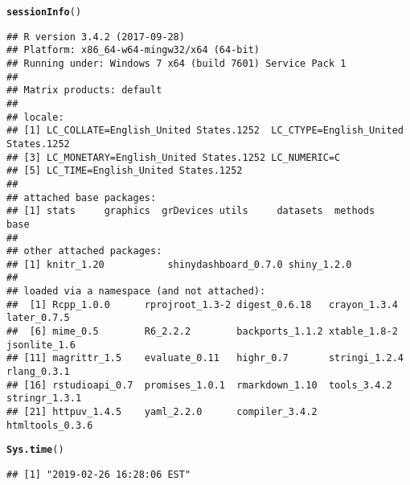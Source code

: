 \documentclass{article}\usepackage[]{graphicx}\usepackage[]{color}
\makeatletter
\newcommand{\hlstd}[1]{\textcolor[rgb]{0.345,0.345,0.345}{#1}}%
\newcommand{\hlkwd}[1]{\textcolor[rgb]{0.737,0.353,0.396}{\textbf{#1}}}%
\newenvironment{kframe}{%
 \def\at@end@of@kframe{}%
 \ifinner\ifhmode%
  \def\at@end@of@kframe{\end{minipage}}%
  \begin{minipage}{\columnwidth}%
 \fi\fi%
 \def\FrameCommand##1{\hskip\@totalleftmargin \hskip-\fboxsep
 \colorbox{shadecolor}{##1}\hskip-\fboxsep
     \hskip-\linewidth \hskip-\@totalleftmargin \hskip\columnwidth}%
 \MakeFramed {\advance\hsize-\width
   \@totalleftmargin\z@ \linewidth\hsize
   \@setminipage}}%
 {\par\unskip\endMakeFramed%
 \at@end@of@kframe}
\newenvironment{knitrout}{}{} %
\makeatother
\begin{document}
\begin{knitrout}
\color{fgcolor}\begin{kframe}
\begin{alltt}
\hlkwd{sessionInfo}\hlstd{()}
\end{alltt}
\begin{verbatim}
## R version 3.4.2 (2017-09-28)
## Platform: x86_64-w64-mingw32/x64 (64-bit)
## Running under: Windows 7 x64 (build 7601) Service Pack 1
## 
## Matrix products: default
## 
## locale:
## [1] LC_COLLATE=English_United States.1252  LC_CTYPE=English_United States.1252   
## [3] LC_MONETARY=English_United States.1252 LC_NUMERIC=C                          
## [5] LC_TIME=English_United States.1252    
## 
## attached base packages:
## [1] stats     graphics  grDevices utils     datasets  methods   base     
## 
## other attached packages:
## [1] knitr_1.20           shinydashboard_0.7.0 shiny_1.2.0         
## 
## loaded via a namespace (and not attached):
##  [1] Rcpp_1.0.0      rprojroot_1.3-2 digest_0.6.18   crayon_1.3.4    later_0.7.5    
##  [6] mime_0.5        R6_2.2.2        backports_1.1.2 xtable_1.8-2    jsonlite_1.6   
## [11] magrittr_1.5    evaluate_0.11   highr_0.7       stringi_1.2.4   rlang_0.3.1    
## [16] rstudioapi_0.7  promises_1.0.1  rmarkdown_1.10  tools_3.4.2     stringr_1.3.1  
## [21] httpuv_1.4.5    yaml_2.2.0      compiler_3.4.2  htmltools_0.3.6
\end{verbatim}
\begin{alltt}
\hlkwd{Sys.time}\hlstd{()}
\end{alltt}
\begin{verbatim}
## [1] "2019-02-26 16:28:06 EST"
\end{verbatim}
\end{kframe}
\end{knitrout}
\end{document}
